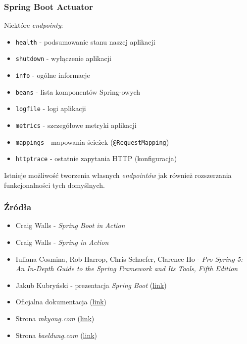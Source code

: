 \documentclass{beamer}
\begin{document}
\begin{frame}
\frametitle{Spring Boot Actuator}
Niektóre \textit{endpointy}:
\begin{itemize}
\item \lstinline{health} - podsumowanie stanu naszej aplikacji
\item \lstinline{shutdown} - wyłączenie aplikacji
\item \lstinline{info} - ogólne informacje
\item \lstinline{beans} - lista komponentów Spring-owych
\item \lstinline{logfile} - logi aplikacji
\item \lstinline{metrics} - szczegółowe metryki aplikacji
\item \lstinline{mappings} - mapowania ścieżek (\lstinline{@RequestMapping})
\item \lstinline{httptrace} - ostatnie zapytania HTTP (konfiguracja)
\end{itemize}
Istnieje możliwość tworzenia własnych \textit{endpointów} jak również rozszerzania funkcjonalności tych domyślnych.
\end{frame}


\begin{frame}
\frametitle{Źródła}
\begin{itemize}
\item Craig Walls - \textit{Spring Boot in Action}
\item Craig Walls - \textit{Spring in Action}
\item Iuliana Cosmina, Rob Harrop, Chris Schaefer, Clarence Ho - \textit{Pro Spring 5: An In-Depth Guide to the Spring Framework and Its Tools, Fifth Edition}
\item Jakub Kubryński - prezentacja \textit{Spring Boot} (\href{https://www.youtube.com/watch?v=zQll41ha5_g&feature=emb_title}{link})
\item Oficjalna dokumentacja (\href{https://docs.spring.io/spring-boot/docs/current/reference/html/spring-boot-features.html}{link})
\item Strona \textit{mkyong.com} (\href{https://mkyong.com/spring-boot/}{link})
\item Strona \textit{baeldung.com} (\href{https://www.baeldung.com/}{link})
\end{itemize}
\end{frame}
\end{document}
